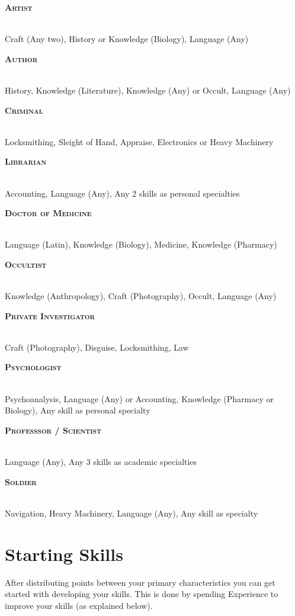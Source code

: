 \newcommand{\makebackground}[3]{
    \noindent
    \begin{minipage}{\linewidth}
        {\raggedright\normalfont\large\bfseries\scshape #1}\\
        #3
    \end{minipage}
    \par
}
\vspace{\parskip}
\begin{multicols}{2}
    \makebackground{Artist}{}
    {Craft (Any two), History or Knowledge (Biology), Language (Any)}

    \makebackground{Author}{}
    {History, Knowledge (Literature), Knowledge (Any) or Occult, Language (Any)}

    \makebackground{Criminal}{}
    {Locksmithing, Sleight of Hand, Appraise, Electronics or Heavy Machinery}
    
    \makebackground{Librarian}{}
    {Accounting, Language (Any), Any 2 skills as personal specialties}
    
    \makebackground{Doctor of Medicine}{}
    {Language (Latin), Knowledge (Biology), Medicine, Knowledge (Pharmacy)}

    \makebackground{Occultist}{}
    {Knowledge (Anthropology), Craft (Photography), Occult, Language (Any)}
   
    \makebackground{Private Investigator}{}
    {Craft (Photography), Disguise, Locksmithing, Law}

    \makebackground{Psychologist}{}
    {Psychoanalysis, Language (Any) or Accounting, Knowledge (Pharmacy or Biology), Any skill as personal specialty}

    \makebackground{Professsor / Scientist}{}
    {Language (Any), Any 3 skills as academic specialties}

    \makebackground{Soldier}{}
    {Navigation, Heavy Machinery, Language (Any), Any skill as specialty}

\end{multicols}

\section{Starting Skills}
After distributing points between your primary characteristics %
you can get started with developing your skills. This is done by spending Experience to improve your skills (as explained below). 

